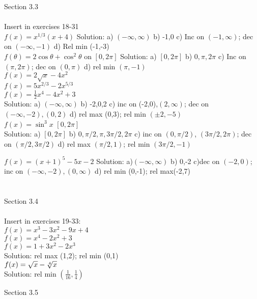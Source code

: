 \documentclass[10pt]{article}
\begin{document}
Section 3.3  \\ \\
   Insert in exercises 18-31\\

$f(x)=x^{1/3}(x+4)$ 		
Solution: a) $(-\infty,\infty)$
b) -1,0
c) Inc on $(-1,\infty)$; dec on $(-\infty,-1)$
d) Rel min (-1,-3) \\

$f(\theta)=2\cos\theta+\cos^2\theta$ on $[0,2\pi]$ 
Solution: a) $[0,2\pi]$ 
b) $0,\pi, 2\pi$
c) Inc on $(\pi,2\pi)$; dec on $(0,\pi)$
d) rel min $(\pi,-1)$\\ 

$f(x)=2\sqrt x -4x^2$ \\

$f(x)=5x^{2/3}-2x^{5/3}$ \\

$f(x)=\frac{1}{2}x^4-4x^2+3$\\
Solution: a) $(-\infty,\infty)$
b) -2,0,2
c) inc on (-2,0),$(2,\infty)$; dec on $(-\infty,-2),(0,2)$
d) rel max (0,3); rel min $(\pm 2, -5)$\\

$f(x)=\sin^3 x$ $[0,2\pi]$\\
Solution: a) $[0,2\pi]$
b) $0,\pi/2,\pi,3\pi/2,2\pi$
c) inc on $(0,\pi/2)$, $(3\pi/2,2\pi)$; dec on $(\pi/2, 3\pi/2)$
d) rel max $(\pi/2, 1 )$; rel min $(3\pi/2,-1)$

$f(x)=(x+1)^5-5x-2$ 
Solution: a)$(-\infty,\infty)$
b) 0,-2
c)dec on $(-2,0)$; inc on $(-\infty,-2), (0,\infty)$
d) rel min (0,-1); rel max(-2,7)\\ \\ \\

Section 3.4 \\ \\

Insert in exercises 19-33: \\

$f(x)=x^3-3x^2-9x+4$\\

$f(x)=x^4-2x^2+3$\\

$f(x)=1+3x^2-2x^3$\\
Solution: rel max (1,2); rel min (0,1)\\

$f(x)=\sqrt x -\root 4 \of x$\\
Solution: rel min $(\frac{1}{16},\frac14)$


Section 3.5 \\ \\
\end{document}
